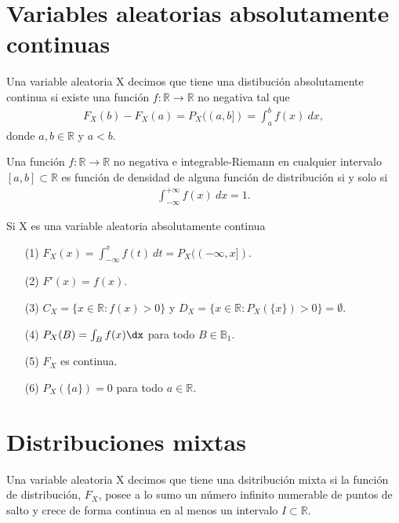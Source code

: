 \section{Variables aleatorias absolutamente continuas}

\begin{defi}
Una variable aleatoria X decimos que tiene una distibución absolutamente continua si existe una función $f: \mathbb{R} \longrightarrow \mathbb{R}$ no negativa tal que
\begin{align*}
    F_X(b) - F_X(a) = P_X((a,b]) = \int_{a}^{b}{f(x) \ dx},
\end{align*}
donde $a, b \in \mathbb{R}$ y $a < b$.
\end{defi}

\begin{prop}
Una función $f: \mathbb{R} \longrightarrow \mathbb{R}$ no negativa e integrable-Riemann en cualquier intervalo $[a,b] \subset \mathbb{R}$ es función de densidad de alguna función de distribución si y solo si
\begin{align*}
    \int_{-\infty}^{+\infty}{f(x) \ dx} = 1.
\end{align*}
\end{prop}

\begin{obs}
Si X es una variable aleatoria absolutamente continua
\begin{enumerate}
    \item[(1)] $F_X(x) = \int_{-\infty}^{x}{f(t) \ dt} = P_X((-\infty,x])$.
    \item[(2)] $F'(x) = f(x)$.
    \item[(3)] $C_X = \{x \in \mathbb{R} : f(x) > 0 \}$ y $D_X = \{x \in \mathbb{R} : P_X(\{x\}) > 0 \} = \emptyset$.
    \item[(4)] $P_X(B) = \int_{B}{f(x) \dx}$ para todo $B \in \mathbb{B}_1$.
    \item[(5)] $F_X$ es continua.
    \item[(6)] $P_X(\{a\}) = 0$ para todo $a \in \mathbb{R}$.
\end{enumerate}
\end{obs}

\section{Distribuciones mixtas}

\begin{defi}
Una variable aleatoria X decimos que tiene una dsitribución mixta si la función de distribución, $F_X$, posee a lo sumo un número infinito numerable de puntos de salto y crece de forma continua en al menos un intervalo $I \subset \mathbb{R}$.
\end{defi}

